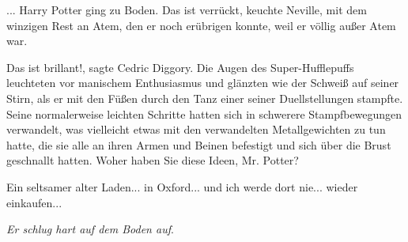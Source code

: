 ... Harry Potter ging zu Boden. \glqq{}Das ist verrückt\grqq{}, keuchte Neville,
mit dem winzigen Rest an Atem, den er noch erübrigen konnte, weil er völlig
außer Atem war.

\glqq{}Das ist brillant!\grqq{}, sagte Cedric Diggory. Die Augen des
Super-Hufflepuffs leuchteten vor manischem Enthusiasmus und glänzten wie der
Schweiß auf seiner Stirn, als er mit den Füßen durch den Tanz einer seiner
Duellstellungen stampfte. Seine normalerweise leichten Schritte hatten sich in
schwerere Stampfbewegungen verwandelt, was vielleicht etwas mit den verwandelten
Metallgewichten zu tun hatte, die sie alle an ihren Armen und Beinen befestigt
und sich über die Brust geschnallt hatten. \glqq{}Woher haben Sie diese Ideen,
Mr. Potter?\grqq{}

\glqq{}Ein seltsamer alter Laden... in Oxford... und ich werde dort nie... wieder
einkaufen...\grqq{}

\emph{Er schlug hart auf dem Boden auf}.

